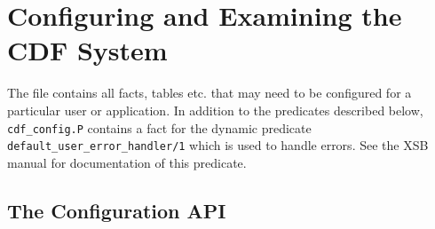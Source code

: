 \section{Configuring and Examining the CDF System} \label{sec:config} 

The file  contains all facts, tables etc. that may
need to be configured for a particular user or application.  In
addition to the predicates described below, {\tt cdf\_config.P}
contains a fact for the dynamic predicate {\tt
default\_user\_error\_handler/1} which is used to handle errors.  See
the XSB manual for documentation of this predicate.

\subsection{The Configuration API} \label{sec:configapi}

